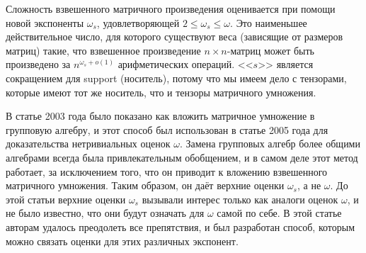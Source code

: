 Сложность взвешенного матричного произведения оценивается при помощи новой экспоненты $\omega_s$, удовлетворяющей $2 \leq \omega_s \leq \omega$. Это наименьшее действительное число, для которого существуют веса (зависящие от размеров матриц) такие, что взвешенное произведение $n \times n$-матриц может быть произведено за $n^{\omega_s + o(1)}$ арифметических операций. <<$s$>> является сокращением для support (носитель), потому что мы имеем дело с тензорами, которые имеют тот же носитель, что и тензоры матричного умножения.

В статье 2003 года \cite{Cohn03} было показано как вложить матричное умножение в групповую алгебру, и этот способ был использован в статье 2005 года \cite{Cohn05} для доказательства нетривиальных оценок $\omega$. Замена групповых алгебр более общими алгебрами всегда была привлекательным обобщением, и в самом деле этот метод работает, за исключением того, что он приводит к вложению взвешенного матричного умножения. Таким образом, он даёт верхние оценки $\omega_s$, а не $\omega$. До этой статьи верхние оценки $\omega_s$ вызывали интерес только как аналоги оценок $\omega$, и не было известно, что они будут означать для $\omega$ самой по себе. В этой статье авторам удалось преодолеть все препятствия, и был разработан способ, которым можно связать оценки для этих различных экспонент.


